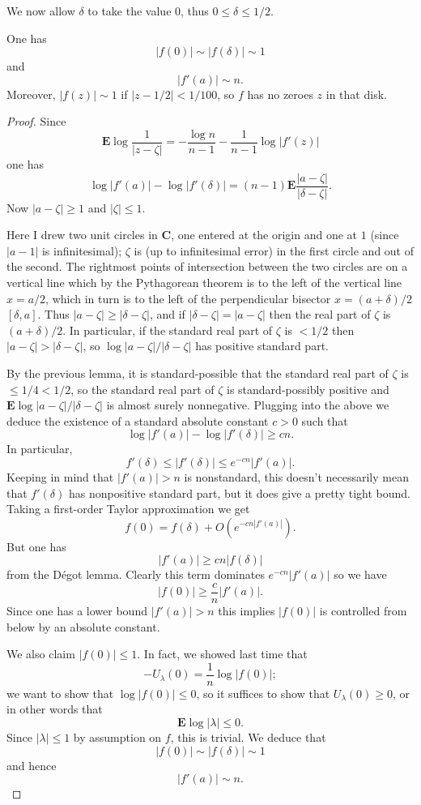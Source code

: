\documentclass[12pt]{article}
\begin{document}
We now allow $\delta$ to take the value $0$, thus $0 \leq \delta \leq 1/2$.
\begin{lemma}
One has
$$|f(0)| \sim |f(\delta)| \sim 1$$
and
$$|f'(a)| \sim n.$$
Moreover, $|f(z)| \sim 1$ if $|z - 1/2| < 1/100$, so $f$ has no zeroes $z$ in that disk.
\end{lemma}
\begin{proof}
Since
$$\mathbf E \log\frac{1}{|z - \zeta|} = -\frac{\log n}{n - 1} - \frac{1}{n - 1} \log |f'(z)|$$
one has
$$\log |f'(a)| - \log |f'(\delta)| = (n-1)\mathbf E \frac{|a - \zeta|}{|\delta - \zeta|}.$$
Now $|a - \zeta| \geq 1$ and $|\zeta| \leq 1$.

Here I drew two unit circles in $\mathbf C$, one entered at the origin and one at $1$ (since $|a - 1|$ is infinitesimal); $\zeta$ is (up to infinitesimal error) in the first circle and out of the second.
The rightmost points of intersection between the two circles are on a vertical line which by the Pythagorean theorem is to the left of the vertical line $x = a/2$, which in turn is to the left of the perpendicular bisector $x = (a+\delta)/2$ $[\delta, a]$.
Thus $|a - \zeta| \geq |\delta - \zeta|$, and if $|\delta - \zeta| = |a - \zeta|$ then the real part of $\zeta$ is $(a+\delta)/2$.
In particular, if the standard real part of $\zeta$ is $< 1/2$ then $|a - \zeta| > |\delta - \zeta|$, so $\log |a - \zeta|/|\delta - \zeta|$ has positive standard part.

By the previous lemma, it is standard-possible that the standard real part of $\zeta$ is $\leq 1/4 < 1/2$, so the standard real part of $\zeta$ is standard-possibly positive and $\mathbf E \log|a-\zeta|/|\delta - \zeta|$ is almost surely nonnegative.
Plugging into the above we deduce the existence of a standard absolute constant $c > 0$ such that
$$\log |f'(a)| - \log |f'(\delta)| \geq cn.$$
In particular,
$$f'(\delta) \leq |f'(\delta)| \leq e^{-cn} |f'(a)|.$$
Keeping in mind that $|f'(a)| > n$ is nonstandard, this doesn't necessarily mean that $f'(\delta)$ has nonpositive standard part, but it does give a pretty tight bound.
Taking a first-order Taylor approximation we get
$$f(0) = f(\delta) + O(e^{-cn|f'(a)|}).$$
But one has
$$|f'(a)| \geq cn |f(\delta)|$$
from the D\'egot lemma.
Clearly this term dominates $e^{-cn}|f'(a)|$ so we have
$$|f(0)| \geq \frac{c}{n} |f'(a)|.$$
Since one has a lower bound $|f'(a)| > n$ this implies $|f(0)|$ is controlled from below by an absolute constant.

We also claim $|f(0)| \leq 1$. In fact, we showed last time that
$$-U_\lambda(0) = \frac{1}{n} \log |f(0)|;$$
we want to show that $\log |f(0)| \leq 0$, so it suffices to show that $U_\lambda(0) \geq 0$, or in other words that
$$\mathbf E \log |\lambda| \leq 0.$$
Since $|\lambda| \leq 1$ by assumption on $f$, this is trivial.
We deduce that
$$|f(0)| \sim |f(\delta)| \sim 1$$
and hence
$$|f'(a)| \sim n.$$


\end{proof}
\end{document}
